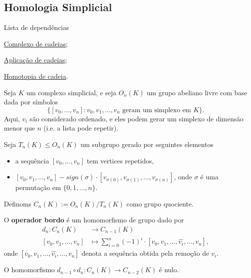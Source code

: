 \subsection{Homologia Simplicial}
\label{homologia-simplicial-def}
\begin{titlemize}{Lista de dependências}
	\item \hyperref[complexo-de-cadeias-def]{Complexo de cadeias};\\ 
    \item \hyperref[aplicacao-de-cadeias-def]{Aplicação de cadeias};\\
    \item \hyperref[homotopia-de-cadeias-def]{Homotopia de cadeia}.
\end{titlemize}
\begin{defi}
	Seja $K$ um complexo simplicial, e seja $O_n (K)$ um grupo abeliano livre com base dada por símbolos 
    \[\{[v_0,...,v_n]:v_0,v_1,...,v_n \text{ geram um simplexo em }K\}.\]
    Aqui, $v_i$ são considerado ordenado, e eles podem gerar um simplexo de dimensão menor que $n$ (i.e. a lista pode repetir).

    Seja $T_n(K)\le O_n(K)$ um subgrupo gerado por seguintes elementos 
    \begin{itemize}
        \item a sequência $[v_0,...,v_n]$ tem vertices repetidos,
        \item $[v_0,v_1,...,v_n]-sign(\sigma)\cdot[v_{\sigma(0)},v_{\sigma(1)},...,v_{\sigma(n)}]$, onde $\sigma$ é uma permutação em $\{0,1,...,n\}$. 
    \end{itemize}
    Definoms $C_n(K):=O_n(K)/T_n(K)$ como grupo quociente.
\end{defi}

\begin{defi}
    O \textbf{operador bordo} é um homomorfismo de grupo dado por 
    \begin{align*}
        d_n:C_n(K)&\longrightarrow C_{n-1}(K)\\
        [v_0,v_1,...,v_n]&\longmapsto \sum_{i=0}^n (-1)^i \cdot[v_0,v_1,...,\widehat{v_i},...,v_n],
    \end{align*}
    onde $[v_0,v_1,...,\widehat{v_i},...,v_n]$ denota a sequência obtida pela remoção de $v_i$.
\end{defi}

\begin{lemma}
    O homomorfismo $d_{n-1}\circ d_n:C_n(K)\rightarrow C_{n-2}(K)$ é nulo.
\end{lemma}

